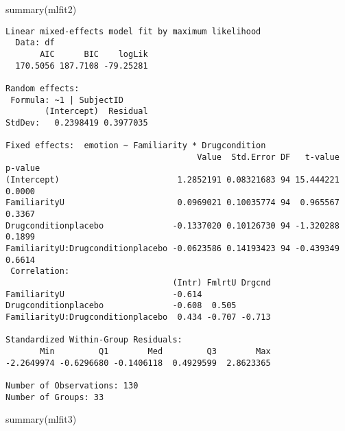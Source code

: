 \documentclass[
  man,
  longtable,
  nolmodern,
  notxfonts,
  notimes,
  colorlinks=true,linkcolor=blue,citecolor=blue,urlcolor=blue]{apa7}
\newenvironment{Shaded}{\begin{snugshade}}{\end{snugshade}}
\newcommand{\FunctionTok}[1]{\textcolor[rgb]{0.28,0.35,0.67}{#1}}
\newcommand{\NormalTok}[1]{\textcolor[rgb]{0.00,0.23,0.31}{#1}}
\begin{document}
\begin{Shaded}
\begin{Highlighting}[]
\FunctionTok{summary}\NormalTok{(mlfit2)}
\end{Highlighting}
\end{Shaded}

\begin{verbatim}
Linear mixed-effects model fit by maximum likelihood
  Data: df 
       AIC      BIC    logLik
  170.5056 187.7108 -79.25281

Random effects:
 Formula: ~1 | SubjectID
        (Intercept)  Residual
StdDev:   0.2398419 0.3977035

Fixed effects:  emotion ~ Familiarity * Drugcondition 
                                       Value  Std.Error DF   t-value p-value
(Intercept)                        1.2852191 0.08321683 94 15.444221  0.0000
FamiliarityU                       0.0969021 0.10035774 94  0.965567  0.3367
Drugconditionplacebo              -0.1337020 0.10126730 94 -1.320288  0.1899
FamiliarityU:Drugconditionplacebo -0.0623586 0.14193423 94 -0.439349  0.6614
 Correlation: 
                                  (Intr) FmlrtU Drgcnd
FamiliarityU                      -0.614              
Drugconditionplacebo              -0.608  0.505       
FamiliarityU:Drugconditionplacebo  0.434 -0.707 -0.713

Standardized Within-Group Residuals:
       Min         Q1        Med         Q3        Max 
-2.2649974 -0.6296680 -0.1406118  0.4929599  2.8623365 

Number of Observations: 130
Number of Groups: 33 
\end{verbatim}

\begin{Shaded}
\begin{Highlighting}[]
\FunctionTok{summary}\NormalTok{(mlfit3)}
\end{Highlighting}
\end{Shaded}
\end{document}
